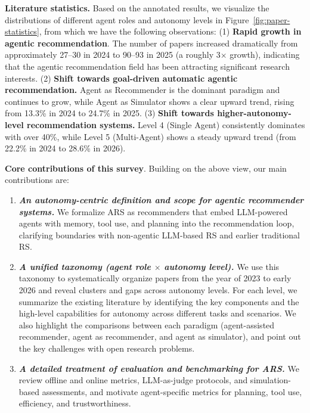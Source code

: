 \vspace{3pt}
\noindent\textbf{Literature statistics.} 
Based on the annotated results, we visualize the distributions of different agent roles and autonomy levels in Figure~\ref{fig:paper-statistics}, from which we have the following observations: 
(1) \textbf{Rapid growth in agentic recommendation}. The number of papers increased dramatically from approximately 27–30 in 2024 to 90–93 in 2025 (a roughly 3× growth), indicating that the agentic recommendation field has been attracting significant research interests.
(2) \textbf{Shift towards goal-driven automatic agentic recommendation.} Agent as Recommender is the dominant paradigm and continues to grow, while Agent as Simulator shows a clear upward trend, rising from 13.3\% in 2024 to 24.7\% in 2025. 
(3) \textbf{Shift towards higher-autonomy-level recommendation systems.} 
Level 4 (Single Agent) consistently dominates with over 40\%, while Level 5 (Multi-Agent) shows a steady upward trend (from 22.2\% in 2024 to 28.6\% in 2026). 




\begin{tcolorbox}[
    colback=myblue!20,        %
    colframe=myblue!80!black, %
    boxrule=0.5pt,
    arc=2pt,
    left=6pt,
    right=6pt,
    top=6pt,
    bottom=6pt
]

\textbf{Core contributions of this survey}. 
Building on the above view, our main contributions are:
\begin{enumerate}[leftmargin=*]
    \item \textit{\textbf{An autonomy-centric definition and scope for agentic recommender systems.}}
    We formalize ARS as recommenders that embed LLM-powered agents with memory, tool use, and planning into the recommendation loop, clarifying boundaries with non-agentic LLM-based RS and earlier traditional RS.

    \item \textit{\textbf{A unified taxonomy (agent role $\times$ autonomy level).}}
    We use this taxonomy to systematically organize papers from the year of 2023 to early 2026 and reveal clusters and gaps across autonomy levels. For each level, we summarize the existing literature by identifying the key components and the high-level capabilities for autonomy across different tasks and scenarios. We also highlight the comparisons between each paradigm (\ie agent-assisted recommender, agent as recommender, and agent as simulator), and point out the key challenges with open research problems. 


    \item \textit{\textbf{A detailed treatment of evaluation and benchmarking for ARS.}}
    We review offline and online metrics, LLM-as-judge protocols, and simulation-based assessments, and motivate agent-specific metrics for planning, tool use, efficiency, and trustworthiness. 


\end{enumerate}

\end{tcolorbox}

